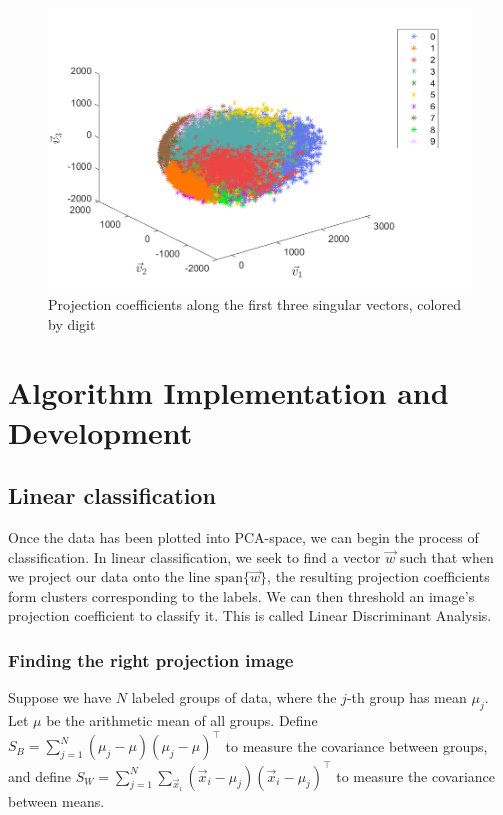 \documentclass{article}
\begin{document}
\begin{figure}
	\centering
	\includegraphics[scale=0.9]{10projections}
	\caption{Projection coefficients along the first three singular vectors, colored by digit}
	\label{fig:10projections}
\end{figure}



\section{Algorithm Implementation and Development}


\subsection{Linear classification}
Once the data has been plotted into PCA-space, we can begin the process of classification. In linear classification, we seek to find a vector $\vec{w}$ such that when we project our data onto the line $\text{span}\{\vec{w}\}$, the resulting projection coefficients form clusters corresponding to the labels. We can then threshold an image's projection coefficient to classify it. This is called Linear Discriminant Analysis.

\subsubsection{Finding the right projection image}

Suppose we have $N$ labeled groups of data, where the $j$-th group has mean $\mu_j$. Let $\mu$ be the arithmetic mean of all groups. Define $S_B = \sum_{j=1}^N (\mu_j - \mu)(\mu_j - \mu)^\top$ to measure the covariance between groups, and define $S_W = \sum_{j=1}^N \sum_{\vec{x}_i}(\vec{x}_i-\mu_j)(\vec{x}_i-\mu_j)^\top$ to measure the covariance between means.
\end{document}
